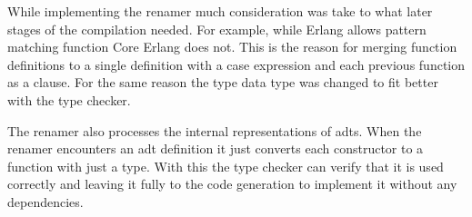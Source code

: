 While implementing the renamer much consideration was take to what later stages of the compilation needed. For example, while Erlang allows pattern matching function Core Erlang does not. This is the reason for merging function definitions to a single definition with a case expression and each previous function as a clause. For the same reason the type data type was changed to fit better with the type checker.

The renamer also processes the internal representations of \glspl{adt}. When the renamer encounters an \gls{adt} definition it just converts each constructor to a function with just a type. With this the type checker can verify that it is used correctly and leaving it fully to the code generation to implement it without any dependencies. 

